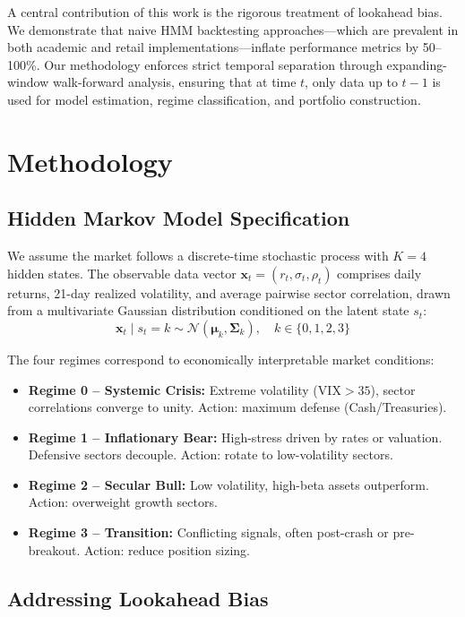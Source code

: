 \documentclass[11pt]{article}
\begin{document}
A central contribution of this work is the rigorous treatment of lookahead bias. We demonstrate that naive HMM backtesting approaches---which are prevalent in both academic and retail implementations---inflate performance metrics by 50--100\%. Our methodology enforces strict temporal separation through expanding-window walk-forward analysis, ensuring that at time $t$, only data up to $t-1$ is used for model estimation, regime classification, and portfolio construction.

\section{Methodology}

\subsection{Hidden Markov Model Specification}

We assume the market follows a discrete-time stochastic process with $K=4$ hidden states. The observable data vector $\mathbf{x}_t = (r_t, \sigma_t, \rho_t)$ comprises daily returns, 21-day realized volatility, and average pairwise sector correlation, drawn from a multivariate Gaussian distribution conditioned on the latent state $s_t$:
\begin{equation}
    \mathbf{x}_t \mid s_t = k \sim \mathcal{N}(\boldsymbol{\mu}_k, \boldsymbol{\Sigma}_k), \quad k \in \{0, 1, 2, 3\}
\end{equation}

The four regimes correspond to economically interpretable market conditions:
\begin{itemize}[nosep]
    \item \textbf{Regime 0 -- Systemic Crisis:} Extreme volatility ($\text{VIX} > 35$), sector correlations converge to unity. Action: maximum defense (Cash/Treasuries).
    \item \textbf{Regime 1 -- Inflationary Bear:} High-stress driven by rates or valuation. Defensive sectors decouple. Action: rotate to low-volatility sectors.
    \item \textbf{Regime 2 -- Secular Bull:} Low volatility, high-beta assets outperform. Action: overweight growth sectors.
    \item \textbf{Regime 3 -- Transition:} Conflicting signals, often post-crash or pre-breakout. Action: reduce position sizing.
\end{itemize}

\subsection{Addressing Lookahead Bias}
\end{document}
